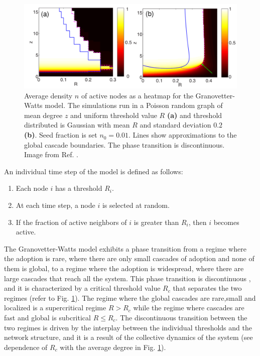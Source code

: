 \begin{figure}
    \centering
    \captionsetup{font=sf}
    \includegraphics[width=\textwidth]{Figs/Introduction/cascade_gleeson.pdf}
    \caption[Cascade diagram of the Granovetter-Watts model]{Average density $n$ of active nodes as a heatmap for the Granovetter-Watts model. The simulations run  in a Poisson random graph of mean degree $z$ and uniform threshold value $R$  \textbf{(a)} and threshold distributed is Gaussian with mean $R$ and standard deviation $0.2$ \textbf{(b)}. Seed fraction is set $n_0 = 0.01$. Lines show approximations to the global cascade boundaries. The phase transition is discontinuous. Image from Ref. \cite{gleeson-2007}.}
    \label{fig:Cascade_gleeson}
\end{figure}

\begin{theorem}
    An individual time step of the model is defined as follows:
    \begin{enumerate}
        \item Each node $i$ has a threshold $R_i$.
        \item At each time step, a node $i$ is selected at random.
        \item If the fraction of active neighbors of $i$ is greater than $R_i$, then $i$ becomes active.
    \end{enumerate}
\end{theorem}

The Granovetter-Watts model exhibits a phase transition from a regime where the adoption is rare, where there are only small cascades of adoption and none of them is global, to a regime where the adoption is widespread, where there are large cascades that reach all the system. This phase transition is discontinuous \cite{watts-2002,gleeson-2007}, and it is characterized by a critical threshold value $R_c$ that separates the two regimes (refer to Fig. \ref{fig:Cascade_gleeson}). The regime where the global cascades are rare,small and localized is a supercritical regime $R > R_c$ while the regime where cascades are fast and global is subcritical $R \leq R_c$. The  discontinuous transition between the two regimes is driven by the interplay between the individual thresholds and the network structure, and it is a result of the collective dynamics of the system (see dependence of $R_c$ with the average degree in Fig. \ref{fig:Cascade_gleeson}).

